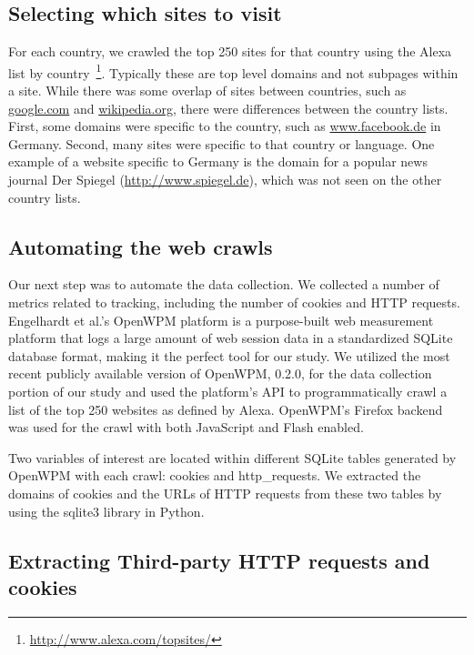 \documentclass[conference]{IEEEtran}
\newcommand{\todo}[1]{}
\renewcommand{\todo}[1]{{\color{red} TODO: {#1}}}
\begin{document}
\subsection{Selecting which sites to visit}
For each country, we crawled the top 250 sites for that country using the Alexa list by country~\footnote{\url{http://www.alexa.com/topsites/}}. Typically these are top level domains and not subpages within a site. While there was some overlap of sites between countries, such as \url{google.com} and \url{wikipedia.org}, there were differences between the country lists.  First, some domains were specific to the country, such as \url{www.facebook.de} in Germany.  Second, many sites were specific to that country or language.  One example of a website specific to Germany is the domain for a popular news journal Der Spiegel (\url{http://www.spiegel.de}), which was not seen on the other country lists.  

\subsection{Automating the web crawls}

Our next step was to automate the data collection.  We collected a number of metrics related to tracking, including the number of cookies and HTTP requests. Engelhardt et al.'s OpenWPM platform is a purpose-built web measurement platform that logs a large amount of web session data in a standardized SQLite database format, making it the perfect tool for our study. We utilized the most recent publicly available version of OpenWPM, 0.2.0, for the data collection portion of our study and used the platform's API to programmatically crawl a list of the top 250 websites as defined by Alexa\cite{Alexa}. OpenWPM's Firefox backend was used for the crawl with both JavaScript and Flash enabled.

Two variables of interest are located within different SQLite tables generated by OpenWPM with each crawl: cookies and http\_requests. We extracted the domains of cookies and the URLs of HTTP requests from these two tables by using the sqlite3 library in Python.

\subsection{Extracting Third-party HTTP requests and cookies}
\end{document}
